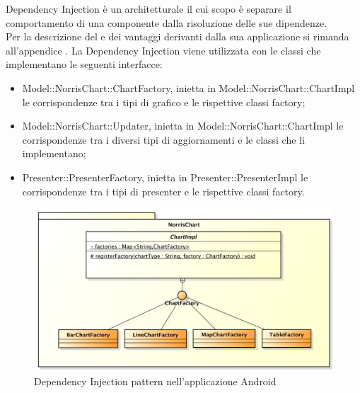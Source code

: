             Dependency Injection è un  architetturale il cui scopo è separare il comportamento di una componente dalla risoluzione delle sue dipendenze.\\
            Per la descrizione del  e dei vantaggi derivanti dalla sua applicazione si rimanda all'appendice .
                La Dependency Injection viene utilizzata con le classi che implementano le seguenti interfacce:
                \begin{itemize}
                    \item Model::NorrisChart::ChartFactory, inietta in Model::NorrisChart::ChartImpl le  corrispondenze tra i tipi di grafico e le rispettive classi factory;
                    \item Model::NorrisChart::Updater, inietta in Model::NorrisChart::ChartImpl le corrispondenze tra i diversi tipi di aggiornamenti e le classi che li implementano;
                     \item Presenter::PresenterFactory, inietta in Presenter::PresenterImpl le corrispondenze tra i tipi di presenter e le rispettive classi factory.
                \end{itemize}
                    \begin{figure}[H]\centering
	        		\includegraphics[width=\textwidth]{SpecificaTecnica/Pics/DesignPatternNorris/DependencyInjection2}
	        		\caption{Dependency Injection pattern nell'applicazione Android}
	    		\end{figure}
